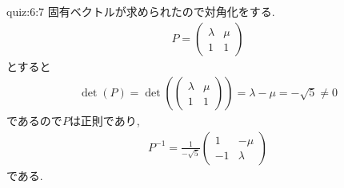 \begin{answerof}{quiz:6:7}
固有ベクトルが求められたので対角化をする.
\begin{align*}
  P=
  \begin{pmatrix}
    \lambda&\mu\\
    1&1    
  \end{pmatrix}
\end{align*}
とすると
\begin{align*}
  \det(P)=
  \det(
  \begin{pmatrix}
    \lambda&\mu\\
    1&1    
  \end{pmatrix})
  =\lambda-\mu=-\sqrt{5}\neq 0
\end{align*}
であるので$P$は正則であり,
\begin{align*}
  P^{-1}=
  \frac{1}{-\sqrt{5}}
  \begin{pmatrix}
    1&-\mu\\
    -1&\lambda    
  \end{pmatrix}
\end{align*}
である.


\end{answerof}
